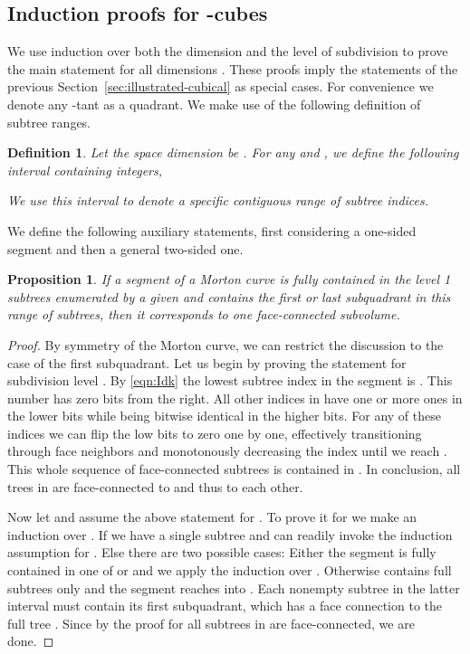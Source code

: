 \documentclass[a4paper,11pt]{article}
\newcommand{\eqnref}[1]{\eqref{eqn:#1}}
\newcommand{\seclab}[1]{\label{sec:#1}}
\newcommand{\secref}[1]{Section~\ref{sec:#1}}
\newtheorem{prop}[thm]{Proposition}
\newtheorem{dfn}[thm]{Definition}
\begin{document}
\subsection{Induction proofs for -cubes}
\seclab{illustrated-arbitrary}

We use induction over both the dimension and the level of subdivision to
prove the main statement for all dimensions .
These proofs imply the statements of the previous \secref{illustrated-cubical} as
special cases.  For convenience we denote any -tant as a quadrant.  We make
use of the following definition of subtree ranges.
\begin{dfn}
  \label{defintervals}
  Let the space dimension be .  For any  and , we define the following interval containing  integers,
  
We use this interval to denote a specific contiguous range of subtree
  indices.
\end{dfn}
We define the following auxiliary statements, first considering a one-sided
segment and then a general two-sided one.
\begin{prop}
  \label{arboneended}
  If a segment of a Morton curve is fully contained in the level 1 subtrees
  enumerated by a given  and contains the first or last subquadrant in
  this range of subtrees, then it corresponds to one face-connected subvolume.
\end{prop}
\begin{proof}
  By symmetry of the Morton curve, we can restrict the discussion to the case
  of the first subquadrant.  Let us begin by proving the statement for
  subdivision level .  By \eqnref{Idk} the lowest subtree index in the
  segment is .  This number has  zero bits from the right.  All
  other indices in  have one or more ones in the lower  bits while
  being bitwise identical in the higher bits.  For any of these indices we can
  flip the low bits to zero one by one, effectively transitioning through face
  neighbors and monotonously decreasing the index until we reach .
  This whole sequence of face-connected subtrees is contained in .  In
  conclusion, all trees in  are face-connected to  and thus to
  each other.

  Now let  and assume the above statement for .  To prove it for
   we make an induction over .  If  we have a single subtree and
  can readily invoke the induction assumption for .  Else there are two
  possible cases: Either the segment is fully contained in one of  or
   and we apply the induction over .  Otherwise  contains
  full subtrees only and the segment reaches into .  Each nonempty
  subtree  in the latter interval must contain its first subquadrant, which
  has a face connection to the full tree .  Since by
  the proof for  all subtrees in  are face-connected, we are
  done.
\end{proof}
\end{document}
